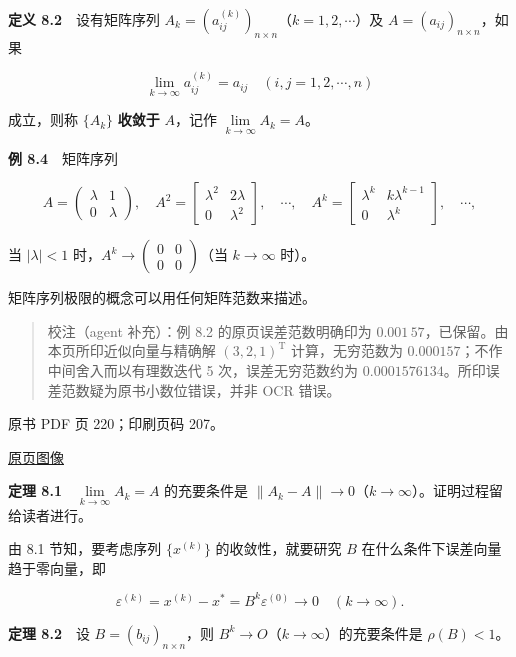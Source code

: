 \textbf{定义 8.2}　设有矩阵序列 \(A_k=(a_{ij}^{(k)})_{n\times n}\)（\(k=1,2,\cdots\)）及 \(A=(a_{ij})_{n\times n}\)，如果

\[
\lim_{k\to\infty}a_{ij}^{(k)}=a_{ij}\quad(i,j=1,2,\cdots,n)
\]

成立，则称 \(\{A_k\}\) \textbf{收敛于} \(A\)，记作 \(\lim\limits_{k\to\infty}A_k=A\)。

\textbf{例 8.4}　矩阵序列

\[
A=\begin{pmatrix}\lambda&1\\0&\lambda\end{pmatrix},\quad
A^2=\begin{bmatrix}\lambda^2&2\lambda\\0&\lambda^2\end{bmatrix},\quad\cdots,\quad
A^k=\begin{bmatrix}\lambda^k&k\lambda^{k-1}\\0&\lambda^k\end{bmatrix},\quad\cdots,
\]

当 \(|\lambda|<1\) 时，\(A^k\to\begin{pmatrix}0&0\\0&0\end{pmatrix}\)（当 \(k\to\infty\) 时）。

矩阵序列极限的概念可以用任何矩阵范数来描述。

\begin{quote}
校注（agent 补充）：例 8.2 的原页误差范数明确印为 \(0.001\,57\)，已保留。由本页所印近似向量与精确解 \((3,2,1)^{\mathrm T}\) 计算，无穷范数为 \(0.000157\)；不作中间舍入而以有理数迭代 5 次，误差无穷范数约为 \(0.0001576134\)。所印误差范数疑为原书小数位错误，并非 OCR 错误。
\end{quote}

\clearpage

原书 PDF 页 220；印刷页码 207。

\href{source-images/pdf-220.jpeg}{原页图像}

\textbf{定理 8.1}　\(\lim\limits_{k\to\infty}A_k=A\) 的充要条件是 \(\|A_k-A\|\to0\)（\(k\to\infty\)）。证明过程留给读者进行。

由 8.1 节知，要考虑序列 \(\{x^{(k)}\}\) 的收敛性，就要研究 \(B\) 在什么条件下误差向量趋于零向量，即

\[
\varepsilon^{(k)}=x^{(k)}-x^*=B^k\varepsilon^{(0)}\to0\quad(k\to\infty).
\]

\textbf{定理 8.2}　设 \(B=(b_{ij})_{n\times n}\)，则 \(B^k\to O\)（\(k\to\infty\)）的充要条件是 \(\rho(B)<1\)。

